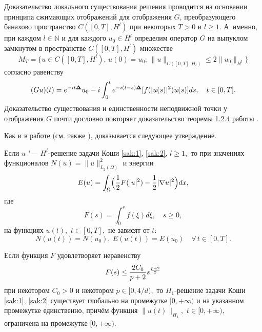 Доказательство локального существования решения проводится на основании принципа сжимающих отображений для отображения $G$, преобразующего
банахово пространство $C([0,T],H^{l})$ при некоторых $T>0$ и
$l\geq 1$. А~именно, при каждом $l\in \mathbb N$ и для каждого $u_{0}\in H^{l}$ определим оператор $G$ на выпуклом замкнутом в пространстве $C([0,T],H^{l})$ множестве
$$
M_{T}=\bigl\{ u\in C([0,T],H^{l}),\, u(0)=u_{0};\, \|u\|_{C([0,T],H_{l})}\leq 2\|u_{0}\|_{H^{l}}\bigr\}
$$
согласно равенству
$$
(Gu)(t)=e^{-it{\bf \Delta }}u_{0}-i\int_{0}^{t}e^{-i(t-s){\bf \Delta }}[f(|u(s)|^2)u(s)]ds,\quad  t\in [0,T].
$$
Доказательство существования и единственности неподвижной точки у отображения $G$ почти дословно повторяет доказательство теоремы 1.2.4 работы \cite{Zhidkov}.

Как и в работе \cite{Glassey}  (см. также \cite{Pazy}), доказывается следующее утверждение. 

\smallskip

\begin{lemma}[1]Если $u$ "--- $H^{l}$-решение задачи Коши \eqref{sak:1}{\rm ,} \eqref{sak:2}{\rm ,}
$l\geq 1,$ то при значениях функционалов  $N(u)=\|u\|^{2}_{L_{2}(\Omega )}$ и энергии 
$$E(u)=\int_{\Omega }\Bigl({1\over 2}F(|u|^2)-{1\over 2}|\nabla u|^2\Bigr)dx,$$ где $$F(s)=\int_0^sf(\xi )d\xi,\quad  s\geq 0,$$
на функциях
$u(t),$ $t\in [0,T],$ не зависят от $t{:}$
$$
N(u(t))=N(u_{0}),\ E(u(t))=E(u_{0})\quad \forall \, t\in [0,T].
$$
\end{lemma}

\begin{lemma}[2]Если функция $F$ удовлетворяет неравенству $$F(s)\leq {{2C_0}\over {p+2}}s^{{{p+2}\over 2}}$$ при некотором $C_0>0$  и некотором $p\in [0,{4/d}),$ то $H_{1}$-решение
задачи Коши \eqref{sak:1}{\rm ,} \eqref{sak:2} существует глобально на промежутке
$[0,+\infty )$ и на указанном промежутке единственно{\rm ,} причём
функция $\| u(t)\| _{H_{1}},$ $t\in [0,+\infty),$ ограничена на
промежутке $[0,+\infty ).$
\end{lemma}

\smallskip

